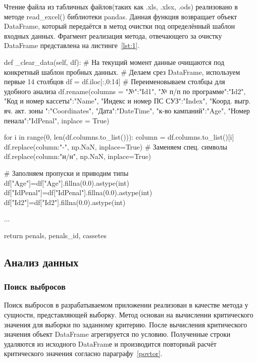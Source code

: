 Чтение файла из табличных файлов(таких как .xls, .xlsx, .ods) реализовано в методе read\_excel() библиотеки pandas. Данная функция возвращает объект DataFrame, который передаётся в метод очистки под определённый шаблон входных данных. Фрагмент реализация метода, отвечающего за очистку DataFrame представлена на листинге~\ref{lst:1}. 

\begin{flushleft}
 \label{lst:1}
\begin{MyCodes}
def _clear_data(self, df):
	# На текущий момент данные очищаются под конкретный шаблон пробных данных.
	# Делаем срез DataFrame, используем первые 14 столбцов
	df = df.iloc[:,0:14] 
	# Переименовываем столбцы для удобного анализа
	df.rename(columns = {
		"№":"Id1",
		"№ п/п по программе":"Id2",
		"Код  и номер кассеты":"Name",
		"Индекс и номер ПС СУЗ":"Index",
		"Коорд. выгр. яч. акт. зоны ":"Coordinates",
		"Дата":"DateTime",
		"к-во кампаний":"Age",
		"Номер пенала":"IdPenal"}, inplace = True)
	
	for i in range(0, len(df.columns.to_list())):
		column = df.columns.to_list()[i]
		df.replace({column:"-"}, np.NaN, inplace=True) # Заменяем спец. символы
		df.replace({column:"н/н"}, np.NaN, inplace=True)
	
	# Заполняем пропуски и приводим типы
	df["Age"]=df["Age"].fillna(0.0).astype(int)
	df["IdPenal"]=df["IdPenal"].fillna(0.0).astype(int)
	df["Id2"]=df["Id2"].fillna(0.0).astype(int)
	
	...
	
	return penals, penals_id, cassetes

\end{MyCodes}
\end{flushleft}

\subsection{Анализ данных}

\subsubsection{Поиск выбросов}

Поиск выбросов в разрабатываемом приложении реализован в качестве метода у сущности, представляющей выборку. Метод основан на вычислении критического значения для выборки по заданному критерию. После вычисления критического значения объект DataFrame агрегируется по условию. Полученные строки удаляются из исходного DataFramе и производится повторный расчёт критического значения согласно параграфу~\ref{povtor}. 

